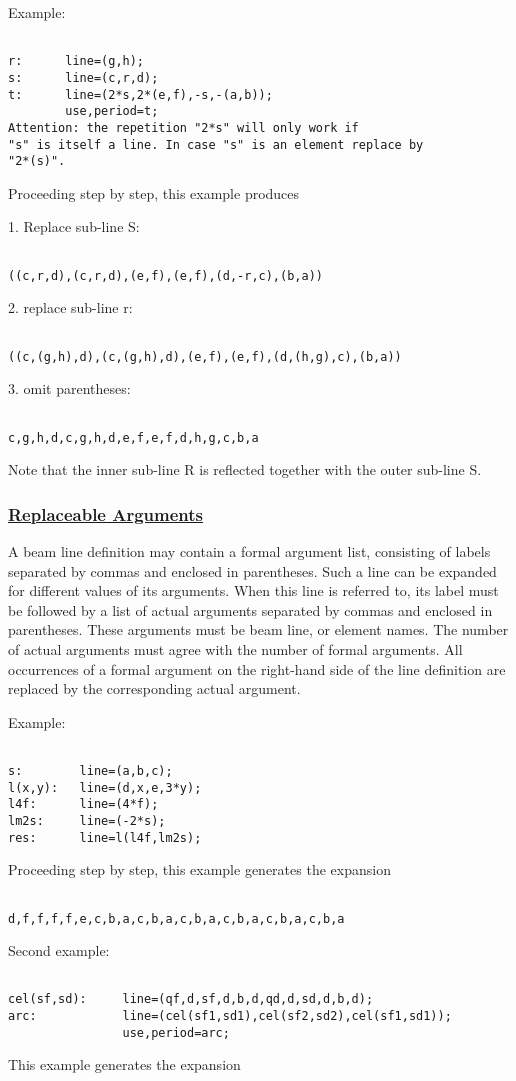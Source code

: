  Example: 
\begin{verbatim}

r:      line=(g,h);
s:      line=(c,r,d);
t:      line=(2*s,2*(e,f),-s,-(a,b));
        use,period=t;
Attention: the repetition "2*s" will only work if
"s" is itself a line. In case "s" is an element replace by
"2*(s)". \end{verbatim} Proceeding step by step, this example produces 

1. Replace sub-line S: 
\begin{verbatim}

((c,r,d),(c,r,d),(e,f),(e,f),(d,-r,c),(b,a))
\end{verbatim}

2. replace sub-line r: 
\begin{verbatim}

((c,(g,h),d),(c,(g,h),d),(e,f),(e,f),(d,(h,g),c),(b,a))
\end{verbatim}

3. omit parentheses: 
\begin{verbatim}

c,g,h,d,c,g,h,d,e,f,e,f,d,h,g,c,b,a
\end{verbatim} Note that the inner sub-line R is reflected together with the outer sub-line S.  

\subsubsection{\href{argument}{Replaceable Arguments}} A beam line definition may contain a formal argument list, consisting of labels separated by commas and enclosed in parentheses. Such a line can be expanded for different values of its arguments. When this line is referred to, its label must be followed by a list of actual arguments separated by commas and enclosed in parentheses. These arguments must be beam line, or element names. The number of actual arguments must agree with the number of formal arguments. All occurrences of a formal argument on the right-hand side of the line definition are replaced by the corresponding actual argument. 

 Example: 
\begin{verbatim}

s:        line=(a,b,c);
l(x,y):   line=(d,x,e,3*y);
l4f:      line=(4*f);
lm2s:     line=(-2*s);
res:      line=l(l4f,lm2s);
\end{verbatim} Proceeding step by step, this example generates the expansion 
\begin{verbatim}

d,f,f,f,f,e,c,b,a,c,b,a,c,b,a,c,b,a,c,b,a,c,b,a
\end{verbatim} Second example: 
\begin{verbatim}

cel(sf,sd):     line=(qf,d,sf,d,b,d,qd,d,sd,d,b,d);
arc:            line=(cel(sf1,sd1),cel(sf2,sd2),cel(sf1,sd1));
                use,period=arc;
\end{verbatim} This example generates the expansion 

